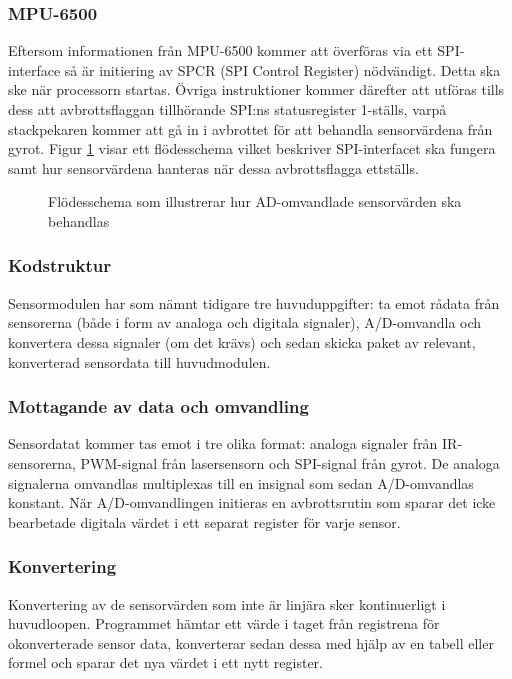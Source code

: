 \documentclass[11pt]{article}
\begin{document}
\begin{flushleft}
\subsubsection{MPU-6500}
Eftersom informationen från MPU-6500 kommer att överföras via ett SPI-interface så är initiering av SPCR (SPI Control Register) nödvändigt. Detta ska ske när processorn startas. Övriga instruktioner kommer därefter att utföras tills dess att avbrottsflaggan tillhörande SPI:ns statusregister 1-ställs, varpå stackpekaren kommer att gå in i avbrottet för att behandla sensorvärdena från gyrot. Figur \ref{datormodul:Avbrott_SPI} visar ett flödesschema vilket beskriver SPI-interfacet ska fungera samt hur sensorvärdena hanteras när dessa avbrottsflagga ettställs.
\begin{figure}[htbp]
\centering
\noindent\resizebox{.5\linewidth}{!}{
	}
	\caption{Flödesschema som illustrerar hur AD-omvandlade sensorvärden ska behandlas\label{datormodul:Avbrott_SPI}}	
\end{figure}
\pagebreak

\subsubsection{Kodstruktur}
Sensormodulen har som nämnt tidigare tre huvuduppgifter: ta emot rådata från sensorerna (både i form av analoga och digitala signaler), A/D-omvandla och konvertera dessa signaler (om det krävs) och sedan skicka paket av relevant, konverterad sensordata till huvudmodulen.

\subsubsection{Mottagande av data och omvandling}
Sensordatat kommer tas emot i tre olika format: analoga signaler från IR-sensorerna, PWM-signal från lasersensorn och SPI-signal från gyrot. De analoga signalerna omvandlas multiplexas till en insignal som sedan A/D-omvandlas konstant. När A/D-omvandlingen initieras en avbrottsrutin som sparar det icke bearbetade digitala värdet i ett separat register för varje sensor. %

\subsubsection{Konvertering}
Konvertering av de sensorvärden som inte är linjära sker kontinuerligt i huvudloopen. Programmet hämtar ett värde i taget från registrena för okonverterade sensor data, konverterar sedan dessa med hjälp av en tabell eller formel och sparar det nya värdet i ett nytt register. 


\end{flushleft}
\end{document}
